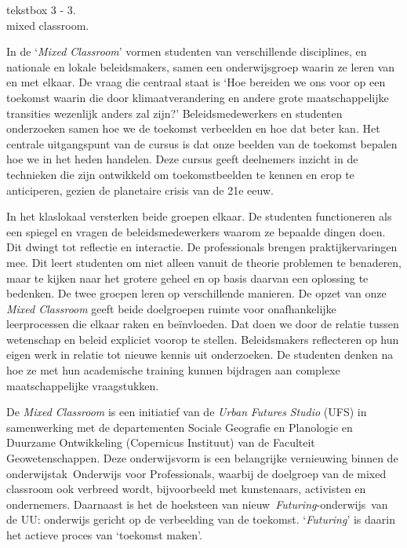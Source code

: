 \documentclass[empirical, authordate, ]{new-jote-article}
\begin{document}
	\begin{bookbox}{\raggedright tekstbox 3 - 3. \\mixed classroom.}
		In de ‘\emph{Mixed Classroom}' vormen studenten van verschillende disciplines, en nationale en lokale beleidsmakers, samen een onderwijsgroep waarin ze leren van en met elkaar. De vraag die centraal staat is ‘Hoe bereiden we ons voor op een toekomst waarin die door klimaatverandering en andere grote maatschappelijke transities wezenlijk anders zal zijn?' Beleidsmedewerkers en studenten onderzoeken samen hoe we de toekomst verbeelden en hoe dat beter kan. Het centrale uitgangspunt van de cursus is dat onze beelden van de toekomst bepalen hoe we in het heden handelen. Deze cursus geeft deelnemers inzicht in de technieken die zijn ontwikkeld om toekomstbeelden te kennen en erop te anticiperen, gezien de planetaire crisis van de 21e eeuw.

		\vspace*{\baselineskip}

		In het klaslokaal versterken beide groepen elkaar. De studenten functioneren als een spiegel en vragen de beleidsmedewerkers waarom ze bepaalde dingen doen. Dit dwingt tot reflectie en interactie. De professionals brengen praktijkervaringen mee. Dit leert studenten om niet alleen vanuit de theorie problemen te benaderen, maar te kijken naar het grotere geheel en op basis daarvan een oplossing te bedenken. De twee groepen leren op verschillende manieren. De opzet van onze \emph{Mixed Classroom} geeft beide doelgroepen ruimte voor onafhankelijke leerprocessen die elkaar raken en beïnvloeden. Dat doen we door de relatie tussen wetenschap en beleid expliciet voorop te stellen. Beleidsmakers reflecteren op hun eigen werk in relatie tot nieuwe kennis uit onderzoeken. De studenten denken na hoe ze met hun academische training kunnen bijdragen aan complexe maatschappelijke vraagstukken.

		\vspace*{\baselineskip}

		De \emph{Mixed Classroom} is een initiatief van de \emph{Urban }\emph{Futures}\emph{ Studio} (UFS) in samenwerking met de departementen Sociale Geografie en Planologie en Duurzame Ontwikkeling (Copernicus Instituut) van de Faculteit Geowetenschappen. Deze onderwijsvorm is een belangrijke vernieuwing binnen de onderwijstak Onderwijs voor Professionals, waarbij de doelgroep van de mixed classroom ook verbreed wordt, bijvoorbeeld met kunstenaars, activisten en ondernemers. Daarnaast is het de hoeksteen van nieuw \emph{Futuring}-onderwijs van de UU: onderwijs gericht op de verbeelding van de toekomst. ‘\emph{Futuring}' is daarin het actieve proces van ‘toekomst maken'.
	\end{bookbox}
\end{document}
